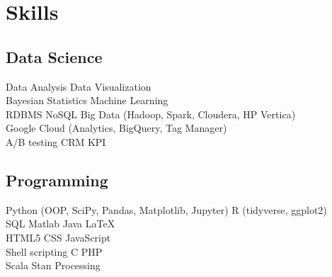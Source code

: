 \documentclass[]{deedy-resume-openfont}
\begin{document}
\begin{minipage}[t]{0.33\textwidth}

\section{Skills}
\subsection{Data Science}
Data Analysis \textbullet{} Data Visualization \\
Bayesian Statistics \textbullet{} Machine Learning \\
RDBMS \textbullet{} NoSQL \textbullet{}
Big Data (Hadoop, Spark, Cloudera, HP Vertica) \\
Google Cloud (Analytics, BigQuery, Tag Manager) \\
A/B testing \textbullet{} CRM \textbullet{} KPI \\
\sectionsep
\subsection{Programming}
Python (OOP, SciPy, Pandas, Matplotlib, Jupyter) \textbullet{}
R (tidyverse, ggplot2) \\
SQL \textbullet{} Matlab \textbullet{} Java \textbullet{} \LaTeX \\ 
HTML5 \textbullet{} CSS \textbullet{} JavaScript \\
Shell scripting \textbullet{} C \textbullet{} PHP \\
Scala \textbullet{} Stan \textbullet{} Processing
\sectionsep

%
%

\end{minipage} 
\hfill
\end{document}
